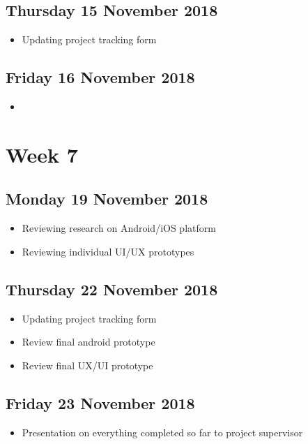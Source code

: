 \subsection*{Thursday 15 November 2018}
\begin{itemize}
	\item Updating project tracking form
\end{itemize}

\subsection*{Friday 16 November 2018}
\begin{itemize}
	\item
\end{itemize}

\section*{Week 7}
\subsection*{Monday 19 November 2018}
\begin{itemize}
	\item Reviewing research on Android/iOS platform
	\item Reviewing individual UI/UX prototypes
\end{itemize}

\subsection*{Thursday 22 November 2018}
\begin{itemize}
	\item Updating project tracking form
	\item Review final android prototype
	\item Review final UX/UI prototype

\end{itemize}

\subsection*{Friday 23 November 2018}
\begin{itemize}
	\item Presentation on everything completed so far to project supervisor
\end{itemize}

